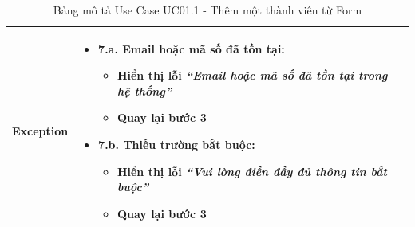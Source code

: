 \begin{table}[H]
\begin{tabular}{|m{}|m{}|}
\textbf{Exception} 
&
\begin{itemize}[label=--]
    \item \textbf{7.a.} Email hoặc mã số đã tồn tại:
    \begin{itemize}[label=+]
        \item Hiển thị lỗi \textit{``Email hoặc mã số đã tồn tại trong hệ thống''}
        \item Quay lại bước 3
    \end{itemize}
    \item \textbf{7.b.} Thiếu trường bắt buộc:
    \begin{itemize}[label=+]
        \item Hiển thị lỗi \textit{``Vui lòng điền đầy đủ thông tin bắt buộc''}
        \item Quay lại bước 3
    \end{itemize}
\end{itemize}
\\ 
\hline

\end{tabular}
\caption{Bảng mô tả Use Case UC01.1 - Thêm một thành viên từ Form}
\end{table}

